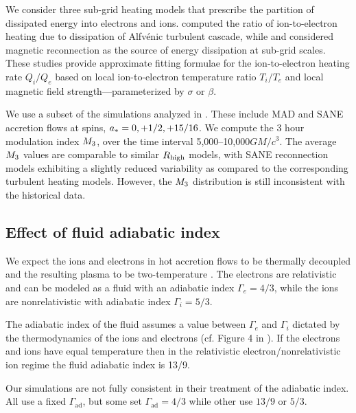We consider three sub-grid heating models that prescribe the partition of dissipated energy into electrons and ions.
\cite{2010MNRAS.409L.104H} computed the ratio of ion-to-electron heating due to dissipation of Alfv\'enic turbulent cascade, while \cite{10.1093/mnras/stx2530} and \cite{Rowan_2017} considered magnetic reconnection as the source of energy dissipation at sub-grid scales.
These studies provide approximate fitting formulae for the ion-to-electron heating rate $Q_{i}/Q_{e}$ based on local ion-to-electron temperature ratio $T_{i}/T_{e}$ and local magnetic field strength---parameterized by $\sigma$ or $\beta$.

We use a subset of the simulations analyzed in \citealt{2020MNRAS.494.4168D}.
These include MAD and SANE accretion flows at spins, $a_* = 0,+1/2,+15/16$.
We compute the 3 hour modulation index $M_{3}$, over the time interval 5,000--10,000$GM/c^{3}$.
The average $M_{3}$ values are comparable to similar $R_\mathrm{high}$ models, with SANE reconnection models exhibiting a slightly reduced variability as compared to the corresponding turbulent heating models.
However, the $M_{3}$ distribution is still inconsistent with the historical data.

\subsection{Effect of fluid adiabatic index}

We expect the ions and electrons in hot accretion flows to be thermally decoupled and the resulting plasma to be two-temperature \citep{1976ApJ...204..187S, Quataert_1998, 10.1093/mnras/stw3116, Ryan_2018, Chael2018}.
The electrons are relativistic and can be modeled as a fluid with an adiabatic index $\Gamma_{e}=4/3$, while the ions are nonrelativistic with adiabatic index $\Gamma_{i}=5/3$.

The adiabatic index of the fluid assumes a value between $\Gamma_{e}$ and $\Gamma_{i}$ dictated by the thermodynamics of the ions and electrons (cf. Figure 4 in \citealt{10.1093/mnras/stw3116}).
If the electrons and ions have equal temperature then in the relativistic electron/nonrelativistic ion regime the fluid adiabatic index is 13/9.

Our simulations are not fully consistent in their treatment of the adiabatic index.
All use a fixed $\Gamma_\mathrm{ad}$, but some set $\Gamma_\mathrm{ad} = 4/3$ while other use $13/9$ or $5/3$.

